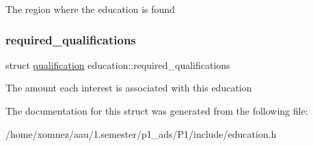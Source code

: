 The region where the education is found \mbox{\label{structeducation_a0e95ac75d550a79ae7e10e915adb59ac}} 
\subsubsection{\texorpdfstring{required\+\_\+qualifications}{required\_qualifications}}
{\footnotesize\ttfamily struct \hyperlink{structqualification}{qualification} education\+::required\+\_\+qualifications}

The amount each interest is associated with this education 

The documentation for this struct was generated from the following file\+:\begin{DoxyCompactItemize}
\item 
/home/xomnez/aau/1.\+semester/p1\+\_\+ads/\+P1/include/education.\+h\end{DoxyCompactItemize}
